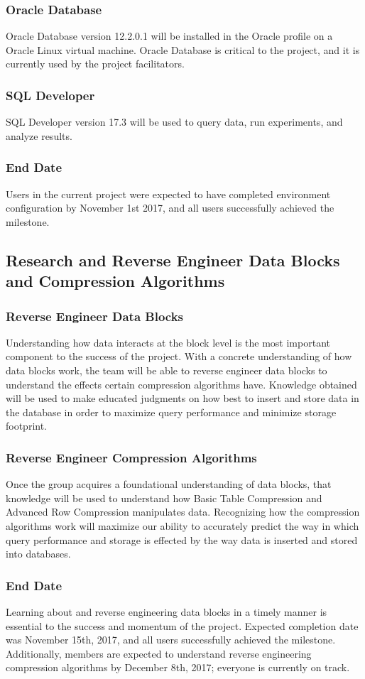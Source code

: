 \documentclass[10pt]{article}
\begin{document}
\subsubsection{Oracle Database}
Oracle Database version 12.2.0.1 will be installed in the Oracle profile on a Oracle Linux virtual machine. Oracle Database is critical to the project, and it is currently used by the project facilitators. 
\subsubsection{SQL Developer}
SQL Developer version 17.3 will be used to query data, run experiments, and analyze results.
\subsubsection{End Date}
Users in the current project were expected to have completed environment configuration by November 1st 2017, and all users successfully achieved the milestone.

\subsection{Research and Reverse Engineer Data Blocks and Compression Algorithms}
\subsubsection{Reverse Engineer Data Blocks}
Understanding how data interacts at the block level is the most important component to the success of the project. With a concrete understanding of how data blocks work, the team will be able to reverse engineer data blocks to understand the effects certain compression algorithms have. Knowledge obtained will be used to make educated judgments on how best to insert and store data in the database in order to maximize query performance and minimize storage footprint.
\subsubsection{Reverse Engineer Compression Algorithms}
Once the group acquires a foundational understanding of data blocks, that knowledge will be used to understand how Basic Table Compression and Advanced Row Compression manipulates data. Recognizing how the compression algorithms work will maximize our ability to accurately predict the way in which query performance and storage is effected by the way data is inserted and stored into databases.
\subsubsection{End Date}
Learning about and reverse engineering data blocks in a timely manner is essential to the success and momentum of the project. Expected completion date was November 15th, 2017, and all users successfully achieved the milestone. Additionally, members are expected to understand reverse engineering compression algorithms by December 8th, 2017; everyone is currently on track.
\end{document}
